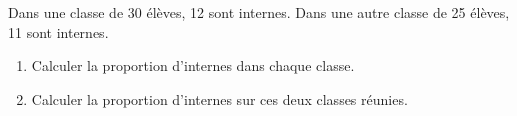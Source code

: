  
Dans une classe de 30 élèves, 12 sont internes. Dans une autre classe de 25 élèves, 11 sont internes.

\begin{enumerate}
\item Calculer la proportion d'internes dans chaque classe.
\item Calculer la proportion d'internes sur ces deux classes réunies.
\end{enumerate}


